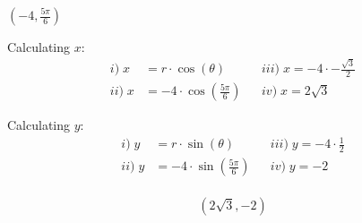 \begin{problem}[22.]
    $\left( -4, \frac{5\pi}{6} \right)$    
\end{problem}

\begin{solution}
    Calculating $x$:
    \begin{align}
        i) \; x &= r \cdot \cos(\theta) && iii) \; x = -4 \cdot - \frac{\sqrt{3}}{2} \\
        ii) \; x &= -4 \cdot \cos \left( \frac{5\pi}{6} \right) && iv) \; \boxed{x = 2\sqrt{3}}
    \end{align}
    
    Calculating $y$:
    \begin{align}
        i) \; y &= r \cdot \sin(\theta) && iii) \; y = -4 \cdot \frac{1}{2} \\
        ii) \; y &= -4 \cdot \sin \left( \frac{5\pi}{6} \right) && iv) \; \boxed{y = -2} \\
    \end{align}
    
    \[\boxed{ (2\sqrt{3}, -2) }\]
\end{solution}